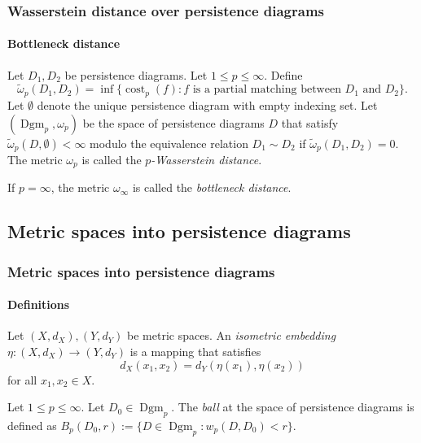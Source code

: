 \documentclass[aspectratio=169]{beamer}
\newcommand{\dgmp}{\operatorname{Dgm}_p}
\newcommand{\costp}{\operatorname{cost}_p}
\newcommand{\wdp}{\omega_p}
\newcommand{\wdi}{\omega_\infty}
\newcommand{\twdp}{\tilde \omega_p}
\begin{document}
  \begin{frame}
    \frametitle{Wasserstein distance over persistence diagrams}
    \framesubtitle{Bottleneck distance}
    \begin{definition} \label{def:Wasserstein}
      Let $ D_1, D_2 $ be persistence diagrams. Let $ 1 \leq p \leq \infty $. Define
      $$
          \twdp (D_1, D_2) = \inf \{\costp(f) : f \text{ is a partial matching between } D_1 \text{ and } D_2 \}.
      $$
      Let $ \emptyset $ denote the unique persistence diagram with empty indexing set. Let $ (\dgmp, \wdp) $ be the space of persistence diagrams $ D $ that satisfy $ \twdp(D, \emptyset) < \infty $ modulo the equivalence relation $ D_1 \sim D_2 $ if $ \twdp (D_1, D_2) = 0 $. The metric $ \wdp $ is called the {\it $p$-Wasserstein distance}.
    \end{definition}

    \begin{definition}
      If $ p = \infty $, the metric $ \wdi $ is called the {\it bottleneck distance}.
    \end{definition}
  \end{frame}

\subsection{Metric spaces into persistence diagrams}
  \begin{frame}
    \frametitle{Metric spaces into persistence diagrams}
    \framesubtitle{Definitions}
    \begin{definition}
      Let $ (X, d_X), (Y, d_Y) $ be metric spaces. An {\it isometric embedding} $ \eta: (X, d_X) \to (Y, d_Y) $ is a mapping that satisfies
      $$
          d_X(x_1, x_2) = d_Y(\eta(x_1), \eta(x_2))
      $$
      for all $x_1, x_2 \in X$.
    \end{definition}

    \begin{definition}
        Let $ 1\leq p \leq \infty $. Let $ D_0 \in \dgmp $. The {\it ball} at the space of persistence diagrams is defined as $ B_p(D_0, r) := \{D \in \dgmp : w_p(D, D_0) < r \} $.
    \end{definition}
  \end{frame}
\end{document}
